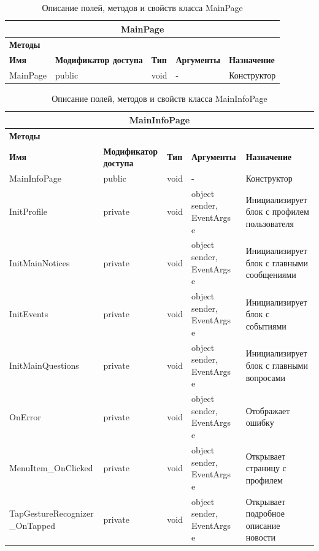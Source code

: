 \documentclass{../includes/TechDoc}
\begin{document}
    \begin{table}[ht]
        \caption{\label{tab:class-mainpage-table}Описание полей, методов и свойств класса MainPage}
        \centering
        \begin{tabular}{|l|p{3cm}|l|p{3cm}|p{5cm}|}
            \hline
            \multicolumn{5}{|c|}{MainPage} \\ \hline
            \multicolumn{5}{|l|}{\textbf{Методы}} \\ \hline
            \textbf{Имя} & \textbf{Модификатор доступа} & \textbf{Тип} & \textbf{Аргументы} & \textbf{Назначение} \\ \hline
            MainPage & public & void & - & Конструктор \\ \hline
        \end{tabular}
    \end{table}

    \newpage

    \begin{table}[ht]
        \caption{\label{tab:class-maininfopage-table}Описание полей, методов и свойств класса MainInfoPage}
        \centering
        \begin{tabular}{|p{4cm}|p{3cm}|l|p{3cm}|p{5cm}|}
            \hline
            \multicolumn{5}{|c|}{MainInfoPage} \\ \hline
            \multicolumn{5}{|l|}{\textbf{Методы}} \\ \hline
            \textbf{Имя} & \textbf{Модификатор доступа} & \textbf{Тип} & \textbf{Аргументы} & \textbf{Назначение} \\ \hline
            MainInfoPage & public & void & - & Конструктор \\ \hline
            InitProfile & private & void & object sender, EventArgs e & Инициализирует блок с профилем пользователя \\ \hline
            InitMainNotices & private & void & object sender, EventArgs e & Инициализирует блок с главными сообщениями \\ \hline
            InitEvents & private & void & object sender, EventArgs e & Инициализирует блок с событиями \\ \hline
            InitMainQuestions & private & void & object sender, EventArgs e & Инициализирует блок с главными вопросами \\ \hline
            OnError & private & void & object sender, EventArgs e & Отображает ошибку \\ \hline
            MenuItem\_OnClicked & private & void & object sender, EventArgs e & Открывает страницу с профилем \\ \hline
            TapGestureRecognizer \_OnTapped & private & void & object sender, EventArgs e & Открывает подробное описание новости \\ \hline
        \end{tabular}
    \end{table}
\end{document}
